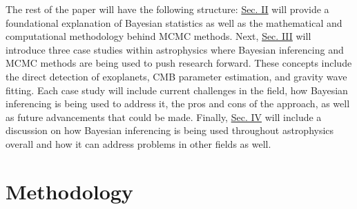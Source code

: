 \documentclass[manuscript,linenumbers,longauthor]{aastex631}
\begin{document}
The rest of the paper will have the following structure: \hyperref[sec:Methodology]{Sec. II} will provide a foundational explanation of Bayesian statistics as well as the mathematical and computational methodology behind MCMC methods. Next, \hyperref[placeholder]{Sec. III} will introduce three case studies within astrophysics where Bayesian inferencing and MCMC methods are being used to push research forward. These concepts include the direct detection of exoplanets, CMB parameter estimation, and gravity wave fitting. Each case study will include current challenges in the field, how Bayesian inferencing is being used to address it, the pros and cons of the approach, as well as future advancements that could be made. Finally, \hyperref[placeholder]{Sec. IV} will include a discussion on how Bayesian inferencing is being used throughout astrophysics overall and how it can address problems in other fields as well.

\section{Methodology}
\label{sec:Methodology}



\end{document}
